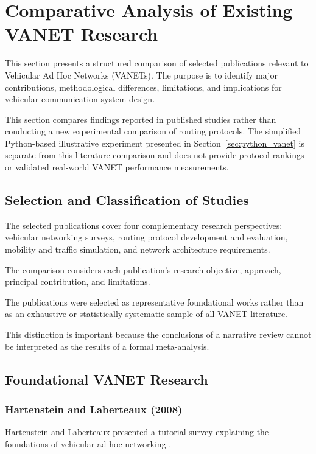 \section{Comparative Analysis of Existing VANET Research}
\label{sec:comparative}

This section presents a structured comparison of
selected publications relevant to Vehicular Ad Hoc
Networks (VANETs). The purpose is to identify
major contributions, methodological differences,
limitations, and implications for vehicular
communication system design.

This section compares findings reported in
published studies rather than conducting a new
experimental comparison of routing protocols.
The simplified Python-based illustrative experiment
presented in Section~\ref{sec:python_vanet} is
separate from this literature comparison and does
not provide protocol rankings or validated
real-world VANET performance measurements.

\subsection{Selection and Classification of Studies}

The selected publications cover four complementary
research perspectives: vehicular networking
surveys, routing protocol development and
evaluation, mobility and traffic simulation,
and network architecture requirements.

The comparison considers each publication's
research objective, approach, principal
contribution, and limitations.

The publications were selected as representative
foundational works rather than as an exhaustive
or statistically systematic sample of all
VANET literature.

This distinction is important because the
conclusions of a narrative review cannot
be interpreted as the results of a formal
meta-analysis.

\subsection{Foundational VANET Research}

\subsubsection{Hartenstein and Laberteaux (2008)}

Hartenstein and Laberteaux presented a tutorial
survey explaining the foundations of vehicular
ad hoc networking \cite{Hartenstein2008}.

